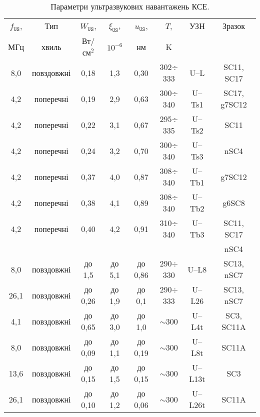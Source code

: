 \begin{table}
\caption{\label{tabUSL}Параметри ультразвукових навантажень КСЕ.
}
\begin{tabular}{|c|c|c|c|c|c|c|c|}
\hline
$f_\mathtt{US}$,&Тип&$W_{\mathtt{US}}$,&$\xi_{\mathtt{US}}$,&$u_{\mathtt{US}}$,&$T$,&УЗН&Зразок\\
МГц&хвиль&Вт/см$^2$&$10^{-6}$&нм&K&&\\
\hline
8,0&повздовжні&0,18&1,3&0,30&302$\div$333&U--L&SC11, SC17\\ \hline
4,2&поперечні&0,19&2,9&0,63&300$\div$340&U--Ts1&SC17, g7SC12\\ \hline
4,2&поперечні&0,22&3,1&0,67&295$\div$335&U--Ts2&SC11\\ \hline
4,2&поперечні&0,24&3,2&0,70&300$\div$340&U--Ts3&nSC4\\ \hline
4,2&поперечні&0,37&4,0&0,87&308$\div$340&U--Tb1&g7SC12\\ \hline
4,2&поперечні&0,38&4,1&0,89&308$\div$340&U--Tb2&g6SC8\\ \hline
4,2&поперечні&0,40&4,2&0,91&310$\div$340&U--Tb3&SC11, SC17\\
&&&&&&&nSC4\\ \hline
8,0&повздовжні&до 1,5&до 5,1&до 0,86&290$\div$330&U--L8&SC13, nSC7\\ \hline
26,1&повздовжні&до 0,26&до 1,9&до 0,1&290$\div$333&U--L26&SC13, nSC7\\ \hline
4,1&повздовжні&до 0,65&до 3,0&до 1,0&$\sim$300&U--L4t&SC3, SC11A\\ \hline
8,0&повздовжні&до 0,09&до 1,1&до 0,19&$\sim$300&U--L8t&SC11A\\ \hline
13,6&повздовжні&до 0,15&до 1,5&до 0,15&$\sim$300&U--L13t&SC3\\ \hline
26,1&повздовжні&до 0,10&до 1,2&до 0,06&$\sim$300&U--L26t& SC11A\\ \hline
\end{tabular}
\end{table}




